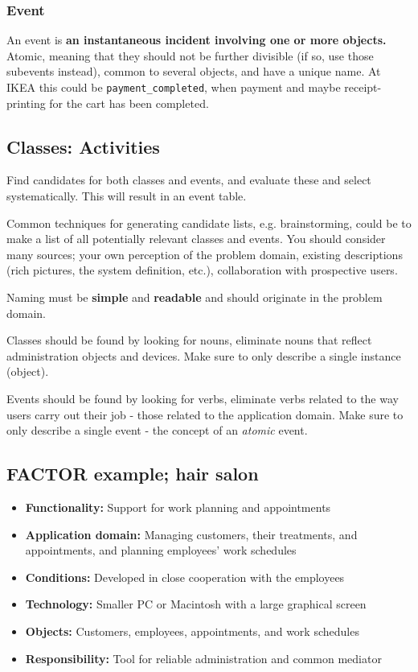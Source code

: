 \subsubsection{Event}
An event is \textbf{an instantaneous incident involving one or more objects.} Atomic, meaning that they should not be further divisible (if so, use those subevents instead), common to several objects, and have a unique name. At IKEA this could be \texttt{payment\_completed}, when payment and maybe receipt-printing for the cart has been completed.

\subsection{Classes: Activities}
Find candidates for both classes and events, and evaluate these and select systematically. This will result in an event table.

Common techniques for generating candidate lists, e.g. brainstorming, could be to make a list of all potentially relevant classes and events. You should consider many sources; your own perception of the problem domain, existing descriptions (rich pictures, the system definition, etc.), collaboration with prospective users.

Naming must be \textbf{simple} and \textbf{readable} and should originate in the problem domain.

\noindent Classes should be found by looking for nouns, eliminate nouns that reflect administration objects and devices. Make sure to only describe a single instance (object).

\noindent Events should be found by looking for verbs, eliminate verbs related to the way users carry out their job - those related to the application domain. Make sure to only describe a single event - the concept of an \textit{atomic} event.

\subsection{FACTOR example; hair salon}
\begin{itemize}
    \item[] \textbf{Functionality: } Support for work planning and appointments
    \item[] \textbf{Application domain: } Managing customers, their treatments, and appointments, and planning employees' work schedules
    \item[] \textbf{Conditions: } Developed in close cooperation with the employees
    \item[] \textbf{Technology: } Smaller PC or Macintosh with a large graphical screen
    \item[] \textbf{Objects: } Customers, employees, appointments, and work schedules
    \item[] \textbf{Responsibility: } Tool for reliable administration and common mediator
\end{itemize}


